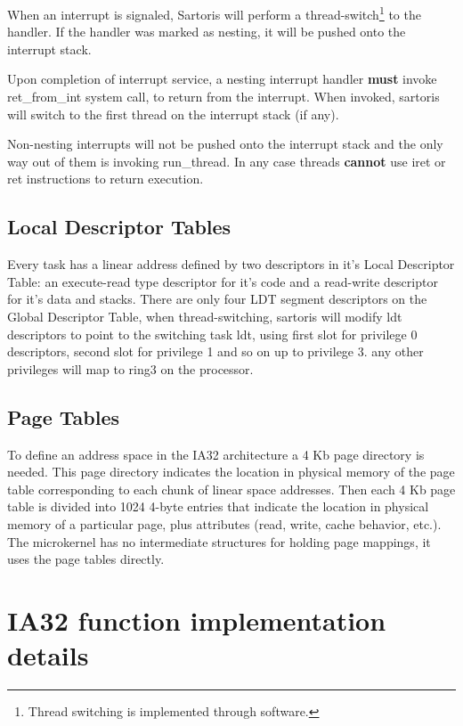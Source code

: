 \documentclass[11pt, letterpaper, twoside, english]{book}
\begin{document}
When an interrupt is signaled, Sartoris will perform a thread-switch\footnote{Thread switching is implemented through software.} to the handler. If the handler was marked as nesting, it will be pushed onto the interrupt stack.

Upon completion of interrupt service, a \textsf{nesting} interrupt handler \textbf{must} invoke \textsf{ret\_from\_int} system call, to return from the interrupt. When invoked, sartoris will switch to the first thread on the interrupt stack (if any).

Non-nesting interrupts will not be pushed onto the interrupt stack and the only way out of them is invoking \textsf{run\_thread}. In any case threads \textbf{cannot} use \textsf{iret} or \textsf{ret} instructions to return execution.

\subsection{Local Descriptor Tables}

Every task has a linear address defined by two descriptors in it's Local Descriptor Table: an execute-read type descriptor for it's code and a read-write descriptor for it's data and stacks. There are only four LDT segment descriptors on the Global Descriptor Table, when thread-switching, sartoris will modify ldt descriptors to point to the switching task ldt, using first slot for privilege 0 descriptors, second slot for privilege 1 and so on up to privilege 3. any other privileges will map to ring3 on the processor.

\subsection{Page Tables}

To define an address space in the IA32 architecture a 4 Kb page directory is needed. This page directory indicates the location in physical memory of the page table corresponding to each chunk of linear space addresses. Then each 4 Kb page table is divided into 1024 4-byte entries that indicate the location in physical memory of a particular page, plus attributes (read, write, cache behavior, etc.). The microkernel has no intermediate structures for holding page mappings, it uses the page tables directly.

\section{IA32 function implementation details}
\end{document}
